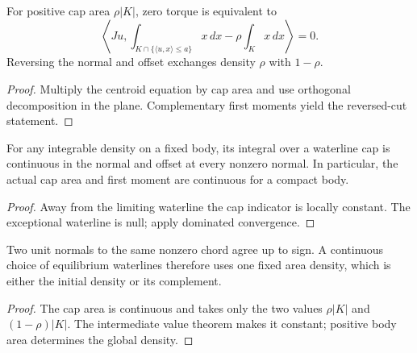 \begin{lemma}
\label{lem:cap-torque}
\leanok
{}
For positive cap area $\rho |K|$, zero torque is equivalent to
\[
 \left\langle Ju,\int_{K\cap\{\langle u,x\rangle\leq a\}}x\,dx
                     -\rho\int_K x\,dx\right\rangle=0.
\]
Reversing the normal and offset exchanges density $\rho$ with $1-\rho$.
\end{lemma}
\begin{proof}
\leanok
Multiply the centroid equation by cap area and use orthogonal decomposition
in the plane. Complementary first moments yield the reversed-cut statement.
\end{proof}

\begin{lemma}
\label{lem:cap-continuity}
\leanok
{}
For any integrable density on a fixed body, its integral over a waterline cap
is continuous in the normal and offset at every nonzero normal. In particular,
the actual cap area and first moment are continuous for a compact body.
\end{lemma}
\begin{proof}
\leanok
Away from the limiting waterline the cap indicator is locally constant.
The exceptional waterline is null; apply dominated convergence.
\end{proof}

\begin{lemma}
\label{lem:cap-orientation}
\leanok
{}
Two unit normals to the same nonzero chord agree up to sign. A continuous
choice of equilibrium waterlines therefore uses one fixed area density,
which is either the initial density or its complement.
\end{lemma}
\begin{proof}
\leanok
The cap area is continuous and takes only the two values
$\rho|K|$ and $(1-\rho)|K|$. The intermediate value theorem makes it constant;
positive body area determines the global density.
\end{proof}

